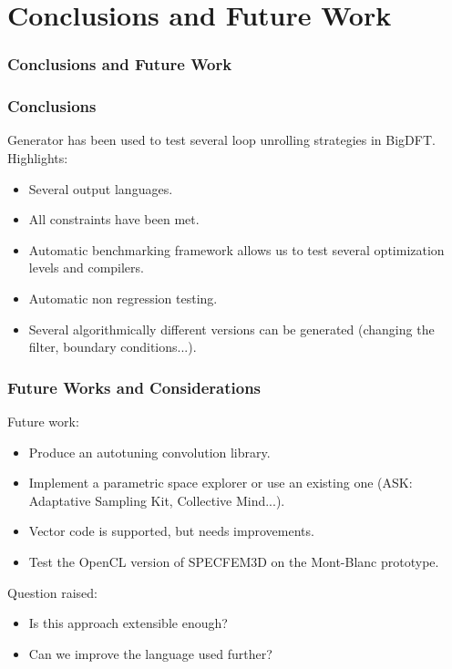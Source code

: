 \documentclass{beamer}
\begin{document}
\section{Conclusions and Future Work}

\begin{frame}
\frametitle{Conclusions and Future Work}
\end{frame}

\begin{frame}
\frametitle{Conclusions}
Generator has been used to test several loop unrolling strategies in BigDFT.\\
Highlights:
\begin{itemize}
\item Several output languages.
\item All constraints have been met.
\item Automatic benchmarking framework allows us to test several optimization levels and compilers.
\item Automatic non regression testing.
\item Several algorithmically different versions can be generated (changing the filter, boundary conditions...).
\end{itemize}
\end{frame}

\begin{frame}
\frametitle{Future Works and Considerations}
Future work:
\begin{itemize}
\item Produce an autotuning convolution library.
\item Implement a parametric space explorer or use an existing one (ASK: Adaptative Sampling Kit, Collective Mind...).
\item Vector code is supported, but needs improvements.
\item Test the OpenCL version of SPECFEM3D on the Mont-Blanc prototype.
\end{itemize}
Question raised:
\begin{itemize}
\item Is this approach extensible enough?
\item Can we improve the language used further?
\end{itemize}

\end{frame}
\end{document}
